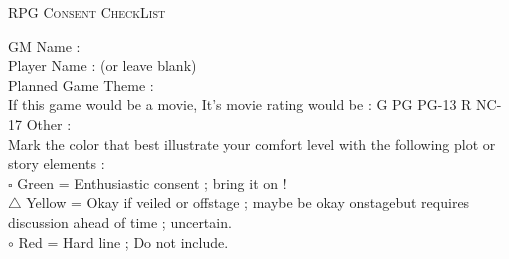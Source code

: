 \documentclass[11pt,twoside,a4paper]{article}
\begin{document}
\setlength\parindent{0pt}

\begin{center} \textsc{\huge RPG Consent CheckList} \end{center}

GM Name : \dotfill~\\

Player Name : (or leave blank) \dotfill~\\

Planned Game Theme : \dotfill~\\

If this game would be a movie, It's movie rating would be : G PG PG-13 R NC-17 Other : \dotfill~\\

Mark the color that best illustrate your comfort level with the following plot or story elements :~\\

{\color{green} $\square$ Green }		= Enthusiastic consent ; bring it on !~\\
{\color{yellow} $\triangle$ Yellow }	= Okay if veiled or offstage ; maybe be okay onstagebut requires discussion ahead of time ; uncertain. ~\\
{\color{red} $\circ$ Red }				= Hard line ; Do not include.~\\ 

\end{document}
